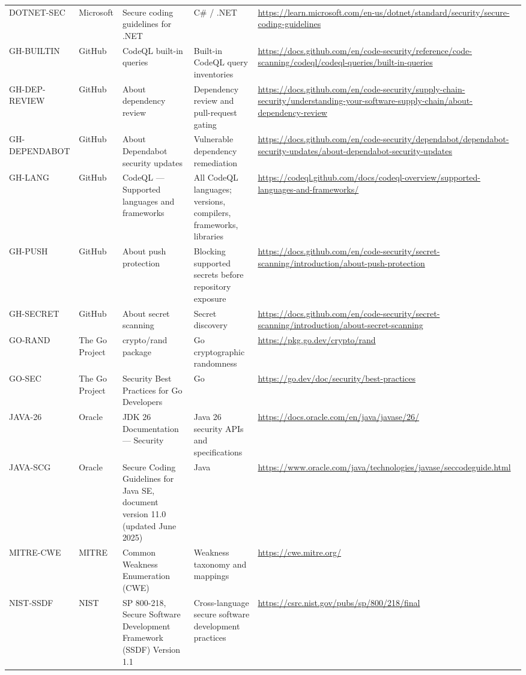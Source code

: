 \documentclass[10pt,letterpaper]{article}
\begin{document}
\begin{landscape}
\begin{longtable}{@{}P{0.82in}P{1.23in}P{2.25in}P{1.7in}P{3.0in}@{}}
DOTNET-SEC & Microsoft & Secure coding guidelines for .NET & C\# / .NET & \url{https://learn.microsoft.com/en-us/dotnet/standard/security/secure-coding-guidelines}\\
GH-BUILTIN & GitHub & CodeQL built-in queries & Built-in CodeQL query inventories & \url{https://docs.github.com/en/code-security/reference/code-scanning/codeql/codeql-queries/built-in-queries}\\
GH-DEP-REVIEW & GitHub & About dependency review & Dependency review and pull-request gating & \url{https://docs.github.com/en/code-security/supply-chain-security/understanding-your-software-supply-chain/about-dependency-review}\\
GH-DEPENDABOT & GitHub & About Dependabot security updates & Vulnerable dependency remediation & \url{https://docs.github.com/en/code-security/dependabot/dependabot-security-updates/about-dependabot-security-updates}\\
GH-LANG & GitHub & CodeQL --- Supported languages and frameworks & All CodeQL languages; versions, compilers, frameworks, libraries & \url{https://codeql.github.com/docs/codeql-overview/supported-languages-and-frameworks/}\\
GH-PUSH & GitHub & About push protection & Blocking supported secrets before repository exposure & \url{https://docs.github.com/en/code-security/secret-scanning/introduction/about-push-protection}\\
GH-SECRET & GitHub & About secret scanning & Secret discovery & \url{https://docs.github.com/en/code-security/secret-scanning/introduction/about-secret-scanning}\\
GO-RAND & The Go Project & crypto/rand package & Go cryptographic randomness & \url{https://pkg.go.dev/crypto/rand}\\
GO-SEC & The Go Project & Security Best Practices for Go Developers & Go & \url{https://go.dev/doc/security/best-practices}\\
JAVA-26 & Oracle & JDK 26 Documentation --- Security & Java 26 security APIs and specifications & \url{https://docs.oracle.com/en/java/javase/26/}\\
JAVA-SCG & Oracle & Secure Coding Guidelines for Java SE, document version 11.0 (updated June 2025) & Java & \url{https://www.oracle.com/java/technologies/javase/seccodeguide.html}\\
MITRE-CWE & MITRE & Common Weakness Enumeration (CWE) & Weakness taxonomy and mappings & \url{https://cwe.mitre.org/}\\
NIST-SSDF & NIST & SP 800-218, Secure Software Development Framework (SSDF) Version 1.1 & Cross-language secure software development practices & \url{https://csrc.nist.gov/pubs/sp/800/218/final}\\

\end{longtable}
\end{landscape}
\end{document}
